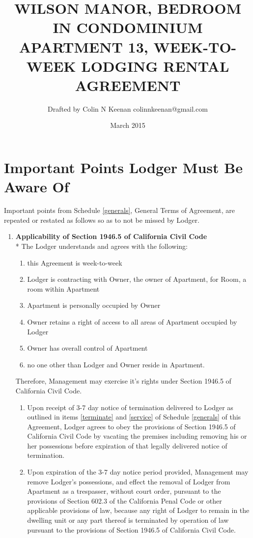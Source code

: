 \documentclass[12pt,letterpaper]{article}
\newcommand{\agreementtitle}{WILSON MANOR, BEDROOM IN CONDOMINIUM APARTMENT 13, WEEK-TO-WEEK LODGING RENTAL AGREEMENT}
\newcommand{\lodger}{Lodger}
\newcommand{\generals}{General Terms of Agreement}
\newcommand{\specifics}{Important Points \lodger{} Must Be Aware Of}
\newcommand{\management}{Management}
\newcommand{\apt}{Apartment}
\newcommand{\room}{Room}
\begin{document}
\title{\agreementtitle{}}
\author{Drafted by Colin N Keenan colinnkeenan@gmail.com}
\date{March 2015}
\maketitle
\thispagestyle{fancy}

\noindent \hrulefill
\section{\specifics{}} \label{specifics}
Important points from Schedule \ref{generals}, \generals{}, are repeated or restated as follows so as to not be missed by \lodger{}.
	\begin{enumerate}
		\item \textbf{Applicability of Section 1946.5 of California Civil Code}\\*
			The \lodger{} understands and agrees with the following:
			\begin{enumerate}
				\item this Agreement is week-to-week
				\item \lodger{} is contracting with Owner, the owner of \apt{}, for \room{}, a room within \apt{}
				\item \apt{} is personally occupied by Owner
				\item Owner retains a right of access to all areas of \apt{} occupied by \lodger{} 
				\item Owner has overall control of \apt{} 
				\item no one other than \lodger{} and Owner reside in \apt{}. 
			\end{enumerate}
			Therefore, \management{} may exercise it's rights under Section 1946.5 of California Civil Code.
			\begin{enumerate}
				\item Upon receipt of 3-7 day notice of termination delivered to \lodger{} as outlined in items \ref{terminate} and \ref{service} of Schedule \ref{generals} of this Agreement, \lodger{} agrees to obey the provisions of Section 1946.5 of California Civil Code by vacating the premises including removing his or her possessions before expiration of that legally delivered notice of termination.
				\item Upon expiration of the 3-7 day notice period provided, \management{} may remove \lodger{}'s possessions, and effect the removal of \lodger{} from \apt{} as a trespasser, without court order, pursuant to the provisions of Section 602.3 of the California Penal Code or other applicable provisions of law, because any right of \lodger{} to remain in the dwelling unit or any part thereof is terminated by operation of law pursuant to the provisions of Section 1946.5 of California Civil Code.
			\end{enumerate} 
	

\end{enumerate}
\end{document}
